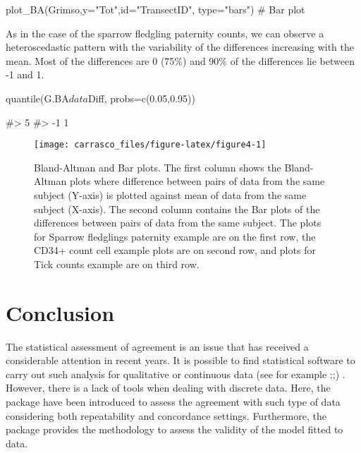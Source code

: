 \begin{Schunk}
\begin{Sinput}
plot_BA(Grimso,y="Tot",id="TransectID", type="bars") # Bar plot
\end{Sinput}
\end{Schunk}

As in the case of the sparrow fledgling paternity counts, we can observe
a heteroscedastic pattern with the variability of the differences
increasing with the mean. Most of the differences are 0 (75\%) and 90\%
of the differences lie between -1 and 1.

\begin{Schunk}
\begin{Sinput}
quantile(G.BA$data$Diff, probs=c(0.05,0.95))
\end{Sinput}
\begin{Soutput}
#>  5% 95% 
#>  -1   1
\end{Soutput}
\end{Schunk}

\begin{Schunk}
\begin{figure}
\texttt{[image: carrasco\_files/figure-latex/figure4-1]} \caption[Bland-Altman and Bar plots]{Bland-Altman and Bar plots. The first column shows the Bland-Altman plots where difference between pairs of data from the same subject (Y-axis) is plotted against mean of data from the same subject (X-axis). The second column contains the Bar plots of the differences between pairs of data from the same subject. The plots for Sparrow fledglings paternity example are on the first row, the CD34+ count cell example plots are on second row, and plots for Tick counts example are on third row.}\label{fig:figure4}
\end{figure}
\end{Schunk}

\hypertarget{conclusion}{%
\section{Conclusion}\label{conclusion}}

The statistical assessment of agreement is an issue that has received a
considerable attention in recent years. It is possible to find
statistical software to carry out such analysis for qualitative or
continuous data (see for example
\citet{Revelle2021};\citet{carrasco2013};\citet{DFeng2020}) . However,
there is a lack of tools when dealing with discrete data. Here, the
 package have been introduced to assess the agreement
with such type of data considering both repeatability and concordance
settings. Furthermore, the  package provides the
methodology to assess the validity of the model fitted to data.

